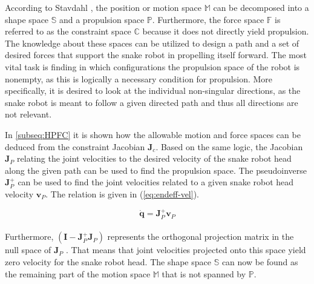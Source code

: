 According to Stavdahl \cite{StavdahlNote}, the position or motion space $\mathbb{M}$ can be decomposed into a shape space $\mathbb{S}$ and a propulsion space $\mathbb{P}$. Furthermore, the force space $\mathbb{F}$ is referred to as the constraint space $\mathbb{C}$ because it does not directly yield propulsion. The knowledge about these spaces can be utilized to design a path and a set of desired forces that support the snake robot in propelling itself forward. The most vital task is finding in which configurations the propulsion space of the robot is nonempty, as this is logically a necessary condition for propulsion. More specifically, it is desired to look at the individual non-singular directions, as the snake robot is meant to follow a given directed path and thus all directions are not relevant.

In \ref{subseq:HPFC} it is shown how the allowable motion and force spaces can be deduced from the constraint Jacobian $\mathbf{J}_c$. Based on the same logic, the Jacobian $\mathbf{J}_P$ relating the joint velocities to the desired velocity of the snake robot head along the given path can be used to find the propulsion space. The pseudoinverse $\mathbf{J}^+_P$ can be used to find the joint velocities related to a given snake robot head velocity $\mathbf{v}_P$. The relation is given in (\ref{eq:endeff-vel}).

\begin{equation}\label{eq:endeff-vel}
    \dot{\mathbf{q}} = \mathbf{J}^+_P \mathbf{v}_P
\end{equation}
\\
Furthermore, $(\mathbf{I} - \mathbf{J}^+_P \mathbf{J}_P)$ represents the orthogonal projection matrix in the null space of $\mathbf{J}_P$ \cite{chiaverini2008kinematically}. That means that joint velocities projected onto this space yield zero velocity for the snake robot head. The shape space $\mathbb{S}$ can now be found as the remaining part of the motion space $\mathbb{M}$ that is not spanned by $\mathbb{P}$.

